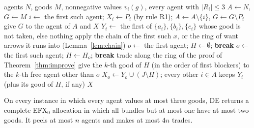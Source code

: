 \documentclass[runningheads,11pt]{llncs}
\newcommand{\efxz}{\texorpdfstring{\mbox{EFX$_0$}}{EFX0}}
\newcommand{\DE}{\textup{DE}}
\begin{document}
\begin{algorithm}[!b]
\caption{Draft and Exchange (\DE{})}\label{alg:de}
\begin{algorithmic}[1]
\Require agents $N$, goods $M$, nonnegative values $v_i(g)$, every agent with $|R_i|\le3$
\State $A\gets N$, $G\gets M$
 
  \State $i\gets$ the first such agent; $X_i\gets P_i$ (by rule R1); $A\gets A\setminus\{i\}$, $G\gets G\setminus P_i$
\EndWhile
{} give $G$ to the agent of $A$ and \Return $X$ \EndIf
{} 
  \State $Y_i\gets$ the first of $\{a_i\},\{b_i\},\{c_i\}$ whose good is not taken, else nothing
\EndFor
\Loop
   
    \State apply the chain of the first such $x$, or the ring of want arrows it runs into (Lemma~\ref{lem:chain})
   
    \State $o\gets$ the first agent; $H\gets\emptyset$; \textbf{break}
   
    \State $o\gets$ the first such agent; $H\gets H_o$; \textbf{break}
  \Else {}
    \State trade along the ring of the proof of Theorem~\ref{thm:improve}
  \EndIf
\EndLoop
\State give the $k$-th good of $H$ (in the order of first blockers) to the $k$-th free agent other than $o$
\State $X_o\gets Y_o\cup(J\setminus H)$; every other $i\in A$ keeps $Y_i$ (plus its good of $H$, if any)
\State \Return $X$
\end{algorithmic}
\end{algorithm}

\begin{theorem}[\DE{} is correct]\label{thm:de}
On every instance in which every agent values at most three goods, \DE{} returns a complete \efxz{} allocation in which all bundles but at most one have at most two goods. It peels at most $n$ agents and makes at most $4n$ trades.
\end{theorem}
\end{document}
